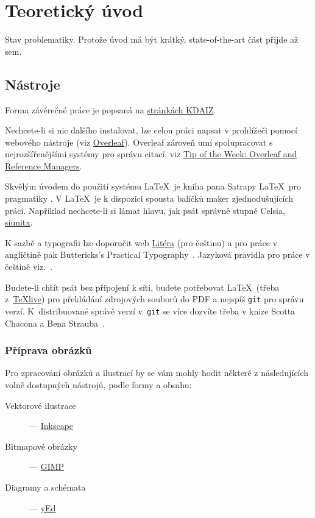 \chapter{Teoretický úvod}
\label{sec:teorie}

\noindent Stav problematiky. Protože úvod má být krátký, state-of-the-art část přijde až sem.

\section{Nástroje}
\label{sec:nastroje}

Forma závěrečné práce je popsaná na   \href{https://kdaiz.fjfi.cvut.cz/informace/zaverecne-rocnikove-prace/prace-rt-rf.html}{stránkách KDAIZ}.

Nechcete-li si nic dalšího instalovat, lze celou práci napsat v prohlížeči pomocí webového nástroje (viz \href{https://overleaf.com}{Overleaf}). Overleaf zároveň umí spolupracovat s nejrozšířenějšími systémy pro správu citací, viz \href{https://www.overleaf.com/blog/639-tip-of-the-week-overleaf-and-reference-managers}{Tip of the Week: Overleaf and Reference Managers}. 

Skvělým úvodem do použití systému \LaTeX\ je kniha pana Satrapy \LaTeX\ pro pragmatiky \cite{satrapa_latex_2011}.
V \LaTeX\ je k dispozici spousta balíčků maker zjednodušujících práci. Například nechcete-li si lámat hlavu, jak psát správně stupně Celsia,  \href{https://texdoc.org/serve/siunitx/0}{siunitx}.

K sazbě a typografii lze doporučit web \href{http://www.liteera.cz}{Litéra} (pro češtinu) a pro práce v angličtině pak Buttericks's Practical Typography~\cite{butterick_matthew_buttericks_nodate}. 
Jazyková pravidla pro práce v češtině viz.~\cite{ijp}.

Budete-li chtít psát bez připojení k síti, budete potřebovat \LaTeX\ (třeba z~\href{https://tug.org/texlive/}{TeXlive}) pro překládání zdrojových souborů do PDF a nejspíš \verb?git? pro správu verzí. K~distribuované správě verzí v~\verb?git? se více dozvíte třeba v knize Scotta Chacona a Bena Strauba~\cite{chacon_pro_2014}.

\subsection{Příprava obrázků}
\label{sec:obrazky}

Pro zpracování obrázků a ilustrací by se vám mohly hodit některé z následujících volně dostupných nástrojů, podle formy a obsahu:
\begin{description}
\item[Vektorové ilustrace] --- \href{https://inkscape.org/cs/}{Inkscape}
\item[Bitmapové obrázky] --- \href{https://gimp.org/}{GIMP}
\item[Diagramy a schémata] --- \href{https://www.yworks.com/products/yed}{yEd}
\end{description}

